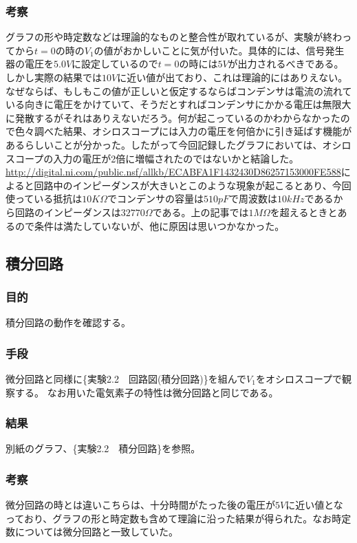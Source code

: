 \documentclass{jsarticle}
\begin{document}
\subsubsection{考察}
グラフの形や時定数などは理論的なものと整合性が取れているが、実験が終わってから$t=0$の時の$V_1$の値がおかしいことに気が付いた。具体的には、信号発生器の電圧を$5.0V$に設定しているので$t=0$の時には$5V$が出力されるべきである。しかし実際の結果では$10V$に近い値が出ており、これは理論的にはありえない。なぜならば、もしもこの値が正しいと仮定するならばコンデンサは電流の流れている向きに電圧をかけていて、そうだとすればコンデンサにかかる電圧は無限大に発散するがそれはありえないだろう。何が起こっているのかわからなかったので色々調べた結果、オシロスコープには入力の電圧を何倍かに引き延ばす機能があるらしいことが分かった。したがって今回記録したグラフにおいては、オシロスコープの入力の電圧が2倍に増幅されたのではないかと結論した。
\url{http://digital.ni.com/public.nsf/allkb/ECABFA1F1432430D86257153000FE588}によると回路中のインピーダンスが大きいとこのような現象が起こるとあり、今回使っている抵抗は$10K\Omega$でコンデンサの容量は$510pF$で周波数は$10kHz$であるから回路のインピーダンスは$32770\Omega$である。上の記事では$1M\Omega$を超えるときとあるので条件は満たしていないが、他に原因は思いつかなかった。

\subsection{積分回路}
\subsubsection{目的}
積分回路の動作を確認する。
\subsubsection{手段}
微分回路と同様に\{実験2.2　回路図(積分回路)\}を組んで$V_1$をオシロスコープで観察する。
なお用いた電気素子の特性は微分回路と同じである。
\subsubsection{結果}
別紙のグラフ、\{実験2.2　積分回路\}を参照。
\subsubsection{考察}
微分回路の時とは違いこちらは、十分時間がたった後の電圧が$5V$に近い値となっており、グラフの形と時定数も含めて理論に沿った結果が得られた。なお時定数については微分回路と一致していた。
\end{document}
